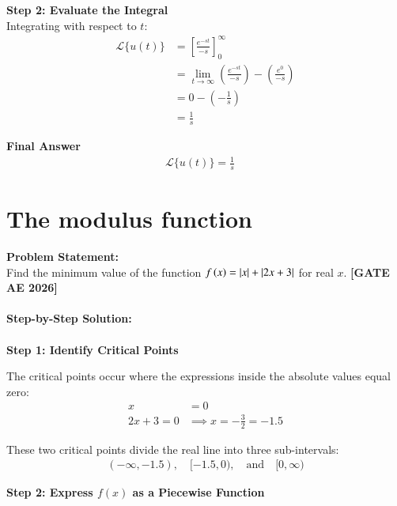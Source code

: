 \documentclass[journal,12pt,onecolumn]{IEEEtran}
\DeclarePairedDelimiter\abs{\lvert}{\rvert}
\newcommand{\brak}[1]{\left(#1\right)}
\theoremstyle{remark}
\begin{document}
\noindent \textbf{Step 2: Evaluate the Integral} \\
Integrating with respect to $t$:
\begin{align}
\mathcal{L}\{u\brak{t}\} &= \left[ \frac{e^{-st}}{-s} \right]_{0}^{\infty} \\[1.5ex]
&= \lim_{t \to \infty} \brak{ \frac{e^{-st}}{-s} } - \brak{ \frac{e^0}{-s} } \\[1.5ex]
&= 0 - \brak{ -\frac{1}{s} } \\[1.5ex]
&= \frac{1}{s}
\end{align}

\noindent \textbf{Final Answer}\\
\begin{align}
\mathcal{L}\{u\brak{t}\} = \frac{1}{s} \quad 
\end{align}
\newpage
\section{The modulus function}

\noindent \textbf{Problem Statement:} \\
Find the minimum value of the function $f\brak{x} = \abs{x} + \abs{2x+3}$ for real $x$. 
\hfill \textbf{[GATE AE 2026]}\\ \\
\noindent \textbf{Step-by-Step Solution:}\\ \\
\noindent \textbf{Step 1: Identify Critical Points}

\noindent The critical points occur where the expressions inside the absolute values equal zero:
\begin{align}
x &= 0 \\[0.5ex]
2x + 3 = 0 &\implies x = -\frac{3}{2} = -1.5
\end{align}

\noindent These two critical points divide the real line into three sub-intervals:
\begin{align}
\brak{-\infty, -1.5}, \quad [-1.5, 0), \quad \text{and} \quad [0, \infty)
\end{align}

\noindent \textbf{Step 2: Express $f\brak{x}$ as a Piecewise Function} \\
\end{document}
